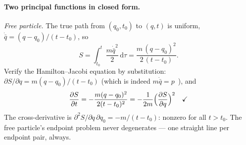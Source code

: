 \documentclass[11pt]{article}
\theoremstyle{plain}
\theoremstyle{definition}
\theoremstyle{remark}
\newcommand{\dd}{\mathrm{d}}
\newcommand{\pd}[2]{\frac{\partial #1}{\partial #2}}
\begin{document}
\paragraph{Two principal functions in closed form.}
\emph{Free particle.} The true path from $(q_0, t_0)$ to $(q, t)$ is
uniform, $\dot{\bar q} = (q - q_0)/(t - t_0)$, so
\begin{equation}
  S = \int_{t_0}^{t}\frac{m\dot{\bar q}^2}{2}\,\dd\tau
    = \frac{m\,(q - q_0)^2}{2\,(t - t_0)} .
  \label{eq:free-principal}
\end{equation}
Verify the Hamilton--Jacobi equation by substitution:
$\partial S/\partial q = m(q - q_0)/(t - t_0)$ (which is indeed
$m\dot{\bar q} = p$~\checkmark), and
\begin{equation}
  \pd{S}{t} = -\frac{m (q - q_0)^2}{2 (t - t_0)^2}
  = -\frac{1}{2m}\Bigl(\pd{S}{q}\Bigr)^{2}
  \quad\checkmark
\end{equation}
The cross-derivative is
$\partial^2 S/\partial q\,\partial q_0 = -m/(t - t_0)$: nonzero for
all $t > t_0$. The free particle's endpoint problem never
degenerates --- one straight line per endpoint pair, always.
\end{document}
